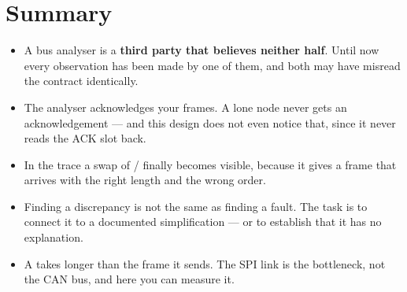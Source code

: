 \section*{Summary}

\begin{itemize}
  \item A bus analyser is a \textbf{third party that believes neither half}. Until now every
    observation has been made by one of them, and both may have misread the contract identically.
  \item The analyser acknowledges your frames. A lone node never gets an acknowledgement --- and
    this design does not even notice that, since it never reads the ACK slot back.
  \item In the trace a swap of / finally becomes visible, because it
    gives a frame that arrives with the right length and the wrong order.
  \item Finding a discrepancy is not the same as finding a fault. The task is to connect it to a
    documented simplification --- or to establish that it has no explanation.
  \item A  takes longer than the frame it sends. The SPI link is the bottleneck, not
    the CAN bus, and here you can measure it.
\end{itemize}
